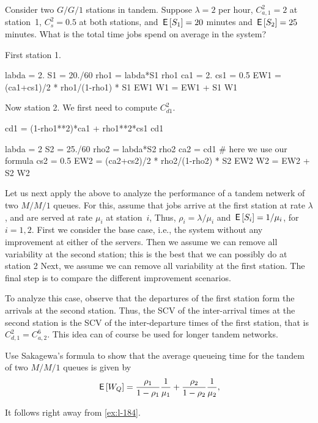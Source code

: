 \begin{exercise}
Consider two $G/G/1$ stations in tandem. Suppose $\lambda=2$ per hour, $C_{a,1}^2=2$ at station~1, $C_s^2=0.5$ at both stations, and $\,\mathsf{E}\left[S_1\right]=20$ minutes and $\,\mathsf{E}\left[S_2\right]=25$ minutes. What is the total time jobs spend on average in the system? 

\begin{solution}
First station 1.
\begin{pyconsole}
labda = 2.
S1 = 20./60
rho1 = labda*S1
rho1
ca1 = 2.
cs1 = 0.5
EW1 = (ca1+cs1)/2 * rho1/(1-rho1) * S1
EW1
W1 = EW1 + S1
W1
\end{pyconsole}

Now station 2. We first need to compute $C_{d1}^2$. 

\begin{pyconsole}
cd1 = (1-rho1**2)*ca1 + rho1**2*cs1
cd1
\end{pyconsole}


\begin{pyconsole}
labda = 2
S2 = 25./60
rho2 = labda*S2
rho2
ca2 = cd1 # here we use our formula
cs2 = 0.5
EW2 = (ca2+cs2)/2 * rho2/(1-rho2) * S2
EW2
W2 = EW2 + S2
W2
\end{pyconsole}


\end{solution}
\end{exercise}




Let us next  apply the above to analyze the performance of a tandem netwerk of two $M/M/1$ queues.
For this, assume that jobs arrive at the first station at rate $\lambda$, and are served at rate $\mu_i$ at station~$i$, Thus, $\rho_i = \lambda/\mu_i$ and $\,\mathsf{E}\left[S_i\right] = 1/\mu_i$, for $i=1,2$.
First we consider the base case, i.e., the system without any improvement at either of the servers.
Then we assume we can remove all variability at the second station; this is the best that we can possibly do at station 2 Next, we assume we can remove all variability at the first station.
The final step is to compare the different improvement scenarios.

To analyze this case, observe that the departures of the first station form the arrivals at the second station.
Thus, the SCV of the inter-arrival times at the second station is the SCV of the inter-departure times of the first station, that is $C_{d,1}^2 = C_{a,2}^6$.
This idea can of course be used for longer tandem networks.



\begin{exercise}
Use Sakagewa's formula to show that the average queueing time for the tandem of two $M/M/1$ queues is given by
\begin{equation}
\,\mathsf{E}\left[W_Q\right] = \frac{\rho_1}{1-\rho_1} \frac1{\mu_1} + \frac{\rho_2}{1-\rho_2} \frac1{\mu_2},
\end{equation}
\begin{solution}
It follows right away from \cref{ex:l-184}.
\end{solution}
\end{exercise}


